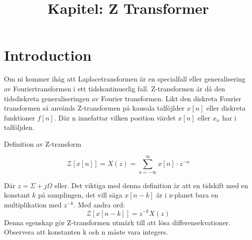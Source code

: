 \documentclass{article}
\title{Kapitel: Z Transformer}
\begin{document}
\maketitle

\section{Introduction}

Om ni kommer ihåg att Laplacetransformen är en specialfall eller generalisering av Fouriertransformen i ett
tidskontinuerlig fall. Z-transformen är då den tidsdiskreta generaliseringen av Fourier transformen.
Likt den diskreta Fourier transformen så används Z-transformen på kausala talföjlder $x[n]$ eller
diskreta funktioner $f[n]$. Där n innefattar vilken position värdet $x[n]$ eller $x_n$ har i talföljden.

Definition av Z-transform

$$\mathcal{Z}[x[n]] = X(z) = \sum_{n=-\infty}^{\infty} x[n] \cdot z^{-n} $$

Där $z = \Sigma + j\Omega$ eller. %
Det viktiga med denna definition är att en tidskift med en konstant $k$ på samplingen, det vill säga $x[n-k]$ är i
z-planet bara en multiplikation med $z^{-k}$. Med andra ord:
$$\mathcal{Z}[x[n-k]] = z^{-k} X(z) $$
Denna egenskap gör Z-transformen utmärk till att lösa differensekvationer. Observera att konstanten k och n
måste vara integers.

\appendix
\end{document}
